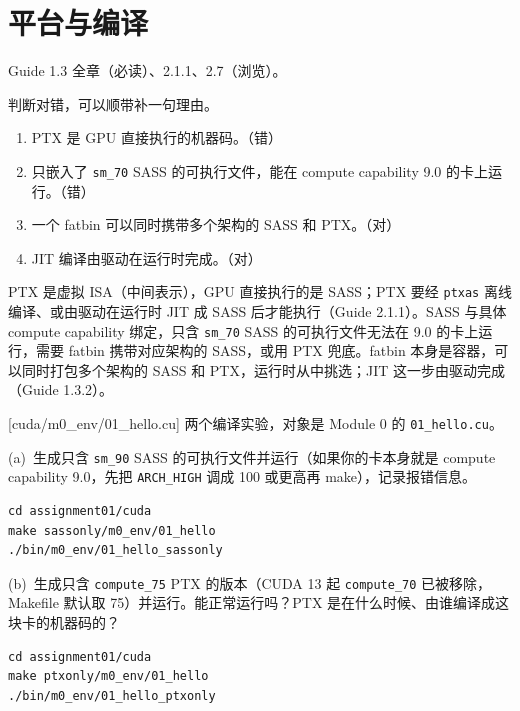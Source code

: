 \documentclass[11pt,a4paper,fontset=none]{ctexart}
\begin{document}
\section{平台与编译}

\begin{reading}
  Guide 1.3 全章（必读）、2.1.1、2.7（浏览）。
\end{reading}

判断对错，可以顺带补一句理由。
\begin{enumerate}[label=(\alph*)]
  \item PTX 是 GPU 直接执行的机器码。（错）
  \item 只嵌入了 \texttt{sm\_70} SASS 的可执行文件，能在 compute capability 9.0 的卡上运行。（错）
  \item 一个 fatbin 可以同时携带多个架构的 SASS 和 PTX。（对）
  \item JIT 编译由驱动在运行时完成。（对）
\end{enumerate}

PTX 是虚拟 ISA（中间表示），GPU 直接执行的是 SASS；PTX 要经 \texttt{ptxas} 离线编译、或由驱动在运行时 JIT 成 SASS 后才能执行（Guide 2.1.1）。SASS 与具体 compute capability 绑定，只含 \texttt{sm\_70} SASS 的可执行文件无法在 9.0 的卡上运行，需要 fatbin 携带对应架构的 SASS，或用 PTX 兜底。fatbin 本身是容器，可以同时打包多个架构的 SASS 和 PTX，运行时从中挑选；JIT 这一步由驱动完成（Guide 1.3.2）。

[cuda/m0\_env/01\_hello.cu]
两个编译实验，对象是 Module 0 的 \texttt{01\_hello.cu}。

(a)~生成只含 \texttt{sm\_90} SASS 的可执行文件并运行（如果你的卡本身就是 compute capability 9.0，先把 \texttt{ARCH\_HIGH} 调成 100 或更高再 make），记录报错信息。

\begin{lstlisting}
cd assignment01/cuda
make sassonly/m0_env/01_hello
./bin/m0_env/01_hello_sassonly
\end{lstlisting}

(b)~生成只含 \texttt{compute\_75} PTX 的版本（CUDA 13 起 \texttt{compute\_70} 已被移除，Makefile 默认取 75）并运行。能正常运行吗？PTX 是在什么时候、由谁编译成这块卡的机器码的？

\begin{lstlisting}
cd assignment01/cuda
make ptxonly/m0_env/01_hello
./bin/m0_env/01_hello_ptxonly
\end{lstlisting}
\end{document}

